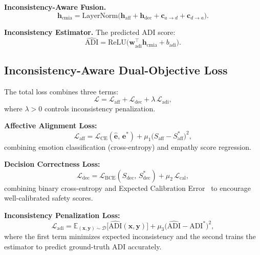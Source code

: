 \documentclass[lettersize,journal]{IEEEtran}
\begin{document}
\textbf{Inconsistency-Aware Fusion.}
\begin{equation}
\mathbf{h}_\mathrm{cmia}
  = \mathrm{LayerNorm}\!\bigl(
      \mathbf{h}_\mathrm{aff}
      + \mathbf{h}_\mathrm{dec}
      + \mathbf{c}_{a\to d}
      + \mathbf{c}_{d\to a}\bigr).
\end{equation}

\textbf{Inconsistency Estimator.}
The predicted ADI score:
\begin{equation}
\widehat{\mathrm{ADI}}
  = \mathrm{ReLU}\!\bigl(
      \mathbf{w}_\mathrm{adi}^\top\mathbf{h}_\mathrm{cmia}
      + b_\mathrm{adi}\bigr).
\label{eq:adi_pred}
\end{equation}

\subsection{Inconsistency-Aware Dual-Objective Loss}

The total loss combines three terms:
\begin{equation}
\mathcal{L}
  = \mathcal{L}_\mathrm{aff}
  + \mathcal{L}_\mathrm{dec}
  + \lambda\,\mathcal{L}_\mathrm{adi},
\label{eq:total_loss}
\end{equation}
where $\lambda > 0$ controls inconsistency penalization.

\textbf{Affective Alignment Loss:}
\begin{equation}
\mathcal{L}_\mathrm{aff}
  = \mathcal{L}_\mathrm{CE}(\hat{\mathbf{e}},\,\mathbf{e}^*)
  + \mu_1\!\bigl(S_\mathrm{aff}-S_\mathrm{aff}^*\bigr)^2,
\end{equation}
combining emotion classification (cross-entropy) and empathy score regression.

\textbf{Decision Correctness Loss:}
\begin{equation}
\mathcal{L}_\mathrm{dec}
  = \mathcal{L}_\mathrm{BCE}(S_\mathrm{dec},\,S_\mathrm{dec}^*)
  + \mu_2\,\mathcal{L}_\mathrm{cal},
\end{equation}
combining binary cross-entropy and Expected Calibration
Error~\cite{guo2017calibration} to encourage well-calibrated safety scores.

\textbf{Inconsistency Penalization Loss:}
\begin{equation}
\mathcal{L}_\mathrm{adi}
  = \mathbb{E}_{(\mathbf{x},\mathbf{y})\sim\mathcal{D}}
    \!\bigl[\widehat{\mathrm{ADI}}(\mathbf{x},\mathbf{y})\bigr]
  + \mu_3\!\bigl(\widehat{\mathrm{ADI}}-\mathrm{ADI}^*\bigr)^2,
\label{eq:ladi}
\end{equation}
where the first term minimizes expected inconsistency and the second
trains the estimator to predict ground-truth ADI accurately.
\end{document}
